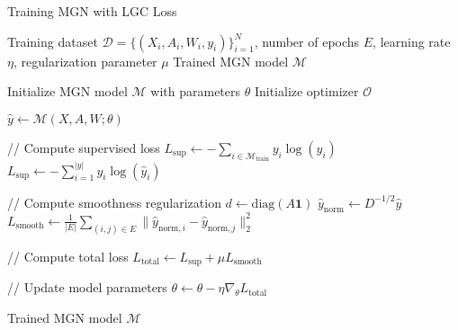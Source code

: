 \begin{algorithm}[ht]
\caption{Training MGN with LGC Loss}
\begin{algorithmic}[1]
\Require Training dataset $\mathcal{D} = \{(X_i, A_i, W_i, y_i)\}_{i=1}^N$, number of epochs $E$, learning rate $\eta$, regularization parameter $\mu$
\Ensure Trained MGN model $\mathcal{M}$

\State Initialize MGN model $\mathcal{M}$ with parameters $\theta$
\State Initialize optimizer $\mathcal{O}$

        \State $\hat{y} \gets \mathcal{M}(X, A, W; \theta)$
        
        \State // Compute supervised loss
            \State $L_{\text{sup}} \gets -\sum_{i \in \mathcal{M}_{\text{train}}} y_i \log(\hat{y}_i)$
        \Else
            \State $L_{\text{sup}} \gets -\sum_{i=1}^{|y|} y_i \log(\hat{y}_i)$
        \EndIf
        
        \State // Compute smoothness regularization
        \State $d \gets \text{diag}(A\mathbf{1})$ 
        \State $\hat{y}_{\text{norm}} \gets D^{-1/2}\hat{y}$ 
        \State $L_{\text{smooth}} \gets \frac{1}{|E|} \sum_{(i,j) \in E} \|\hat{y}_{\text{norm},i} - \hat{y}_{\text{norm},j}\|_2^2$
        
        \State // Compute total loss
        \State $L_{\text{total}} \gets L_{\text{sup}} + \mu L_{\text{smooth}}$
        
        \State // Update model parameters
        \State $\theta \gets \theta - \eta \nabla_\theta L_{\text{total}}$
    \EndFor
\EndFor

\Return Trained MGN model $\mathcal{M}$
\end{algorithmic}
\end{algorithm}